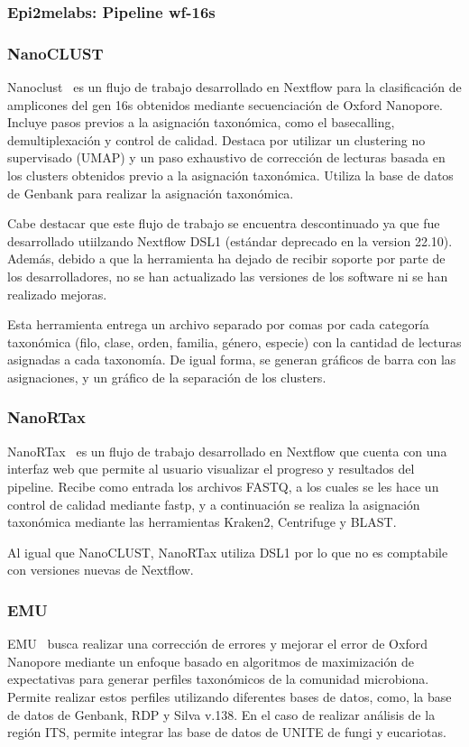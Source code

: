 \subsubsection{Epi2melabs: Pipeline wf-16s}

\subsubsection{NanoCLUST}
Nanoclust~\cite{10.1093/bioinformatics/btaa900} es un flujo de trabajo desarrollado en Nextflow para la clasificación de amplicones del gen 16s obtenidos mediante secuenciación de Oxford Nanopore. 
Incluye pasos previos a la asignación taxonómica, como el basecalling, demultiplexación y control de calidad. 
Destaca por utilizar un clustering no supervisado (UMAP) y un paso exhaustivo de corrección de lecturas basada en los clusters obtenidos previo a la asignación taxonómica.
Utiliza la base de datos de Genbank para realizar la asignación taxonómica.

Cabe destacar que este flujo de trabajo se encuentra descontinuado ya que fue desarrollado utiilzando Nextflow DSL1 (estándar deprecado en la version 22.10). Además, debido a que la herramienta ha dejado de recibir soporte por parte de los desarrolladores, no se han actualizado las versiones de los software ni se han realizado mejoras.

Esta herramienta entrega un archivo separado por comas por cada categoría taxonómica (filo, clase, orden, familia, género, especie) con la cantidad de lecturas asignadas a cada taxonomía. 
De igual forma, se generan gráficos de barra con las asignaciones, y un gráfico de la separación de los clusters. 
\subsubsection{NanoRTax}

NanoRTax~\cite{RODRIGUEZPEREZ20225350} es un flujo de trabajo desarrollado en Nextflow que cuenta con una interfaz web que permite al usuario visualizar el progreso y resultados del pipeline.
Recibe como entrada los archivos FASTQ, a los cuales se les hace un control de calidad mediante fastp, y a continuación se realiza la asignación taxonómica mediante las herramientas Kraken2, Centrifuge y BLAST. 

Al igual que NanoCLUST, NanoRTax utiliza DSL1 por lo que no es comptabile con versiones nuevas de Nextflow.
\subsubsection{EMU}
EMU~\cite{curry2022emu} busca realizar una corrección de errores y mejorar el error de Oxford Nanopore mediante un enfoque basado en algoritmos de maximización de expectativas para generar perfiles taxonómicos de la comunidad microbiona. Permite realizar estos perfiles utilizando diferentes bases de datos, como, la base de datos de Genbank,  RDP y Silva v.138. En el caso de realizar análisis de la región ITS, permite integrar las base de datos de UNITE de fungi y eucariotas.

